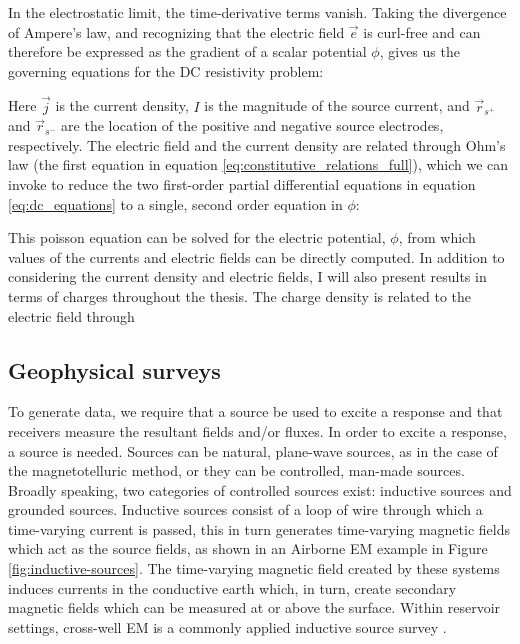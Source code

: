 In the electrostatic limit, the time-derivative terms vanish. Taking the divergence of Ampere's law, and recognizing that the electric field $\vec{e}$ is curl-free and can therefore be expressed as the gradient of a scalar potential $\phi$, gives us the governing equations for the DC resistivity problem:

Here $\vec{j}$ is the current density, $I$ is the magnitude of the source current, and $\vec{r}_{s^+}$ and $\vec{r}_{s^-}$ are the location of the positive and negative source electrodes, respectively. The electric field and the current density are related through Ohm’s law (the first equation in equation \ref{eq:constitutive_relations_full}), which we can invoke to reduce the two first-order partial differential equations in equation \ref{eq:dc_equations} to a single, second order equation in $\phi$:

This poisson equation can be solved for the electric potential, $\phi$, from which values of the currents and electric fields can be directly computed. In addition to considering the current density and electric fields, I will also present results in terms of charges throughout the thesis. The charge density is related to the electric field through


\subsection{Geophysical surveys}
To generate data, we require that a source be used to excite a response and that receivers measure the resultant fields and/or fluxes. In order to excite a response, a source is needed. Sources can be natural, plane-wave sources, as in the case of the magnetotelluric method, or they can be controlled, man-made sources. Broadly speaking, two categories of controlled sources exist: inductive sources and grounded sources. Inductive sources consist of a loop of wire through which a time-varying current is passed, this in turn generates time-varying magnetic fields which act as the source fields, as shown in an Airborne EM example in Figure \ref{fig:inductive-sources}. The time-varying magnetic field created by these systems induces currents in the conductive earth which, in turn, create secondary magnetic fields which can be measured at or above the surface. Within reservoir settings, cross-well EM is a commonly applied inductive source survey \citep{Wilt1995}.







